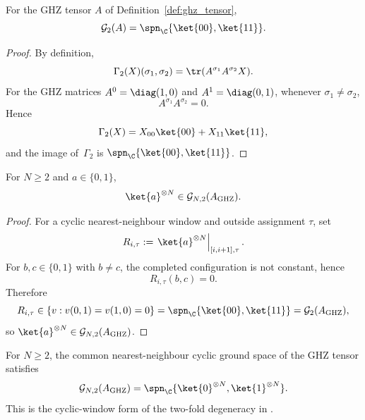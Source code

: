 \begin{theorem}\label{thm:ghz_ground_space_two}
    \leanok
    For the GHZ tensor $A$ of Definition~\ref{def:ghz_tensor},
    \[
        \mathcal G_2(A)
        =
        \spn_{\C}\{\ket{00},\ket{11}\}.
    \]
\end{theorem}

\begin{proof}
    \leanok
    By definition,
    \[
        \Gamma_2(X)(\sigma_1,\sigma_2)
        =
        \tr(A^{\sigma_1}A^{\sigma_2}X).
    \]
    For the GHZ matrices
    $A^0=\diag(1,0)$ and $A^1=\diag(0,1)$,
    whenever $\sigma_1\ne\sigma_2$,
    \[
        A^{\sigma_1}A^{\sigma_2}=0.
    \]
    Hence
    \[
        \Gamma_2(X)
        =
        X_{00}\ket{00}+X_{11}\ket{11},
    \]
    and the image of~$\Gamma_2$ is
    $\spn_{\C}\{\ket{00},\ket{11}\}$.
\end{proof}

\begin{theorem}
    \label{thm:constant_ket_mem_ghz_chain_ground_space}
    \leanok
    For $N\ge2$ and $a\in\{0,1\}$,
    \[
        \ket{a}^{\otimes N}\in\mathcal G_{N,2}(A_{\mathrm{GHZ}}).
    \]
\end{theorem}

\begin{proof}
    \leanok
    For a cyclic nearest-neighbour window and outside assignment $\tau$, set
    \[
        R_{i,\tau}
        :=
        \left.\ket{a}^{\otimes N}\right|_{[i,i+1],\tau}.
    \]
    For $b,c\in\{0,1\}$ with $b\ne c$, the completed configuration is not
    constant, hence
    \[
        R_{i,\tau}(b,c)=0.
    \]
    Therefore
    \[
        R_{i,\tau}
        \in
        \{v:v(0,1)=v(1,0)=0\}
        =
        \spn_{\C}\{\ket{00},\ket{11}\}
        =
        \mathcal G_2(A_{\mathrm{GHZ}}),
    \]
    so $\ket{a}^{\otimes N}\in\mathcal G_{N,2}(A_{\mathrm{GHZ}})$.
\end{proof}

\begin{theorem}
    \label{thm:ghz_chain_ground_space_two}
    \leanok
    For $N\ge2$, the common nearest-neighbour cyclic ground space of the GHZ
    tensor satisfies
    \[
        \mathcal G_{N,2}(A_{\mathrm{GHZ}})
        =
        \spn_{\C}\{
            \ket{0}^{\otimes N},
            \ket{1}^{\otimes N}
        \}.
    \]
    This is the cyclic-window form of the two-fold degeneracy in
    \cite[line~2205]{Cirac2021Matrix}.
\end{theorem}

